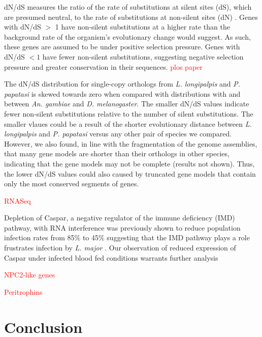 dN/dS measures the ratio of the rate of substitutions at silent sites (dS), which are presumed neutral, to the rate of substitutions at non-silent sites (dN) \cite{Kryazhimskiy2008}. Genes with dN/dS $>$ 1 have non-silent substitutions at a higher rate than the background rate of the organism's evolutionary change would suggest.  As such, these genes are assumed to be under positive selection pressure.  Genes with dN/dS $<1$ have fewer non-silent substitutions, suggesting negative selection pressure and greater conservation in their sequences. \textcolor{red}{plos paper} 


The dN/dS distribution for single-copy orthologs from \emph{L. longipalpis} and \emph{P. papatasi} is skewed towards zero when compared with distributions with and between \emph{An. gambiae} and \emph{D. melanogaster}.  The smaller dN/dS values indicate fewer non-silent substitutions relative to the number of silent substitutions.  The smaller vlaues could be a result of the shorter evolutionary distance between \emph{L. longipalpis} and \emph{P. papatasi} versus any other pair of species we compared.  However, we also found, in line with the fragmentation of the genome assemblies, that many gene models are shorter than their orthologs in other species, indicating that the gene models may not be complete (results not shown).  Thus, the lower dN/dS values could also caused by truncated gene models that contain only the most conserved segments of genes.

\textcolor{red}{RNASeq}
  
Depletion of Caspar, a negative regulator of the immune deficiency (IMD) pathway, with RNA interference was previously shown to reduce population infection rates from 85\% to 45\% suggesting that the IMD pathway plays a role frustrates infection by \emph{L. major} \cite{Telleria2012}.  Our observation of reduced expression of Caspar under infected blood fed conditions warrants further analysis

\textcolor{red}{NPC2-like genes}

\textcolor{red}{Peritrophins}

\section{Conclusion}





